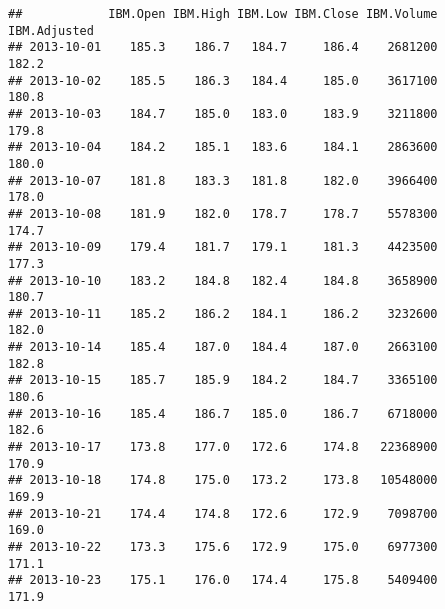 \begin{knitrout}
\color{fgcolor}\begin{kframe}
\begin{alltt}
\hlstd{(}\hlstd{,}  
\end{alltt}
\begin{verbatim}
##            IBM.Open IBM.High IBM.Low IBM.Close IBM.Volume IBM.Adjusted
## 2013-10-01    185.3    186.7   184.7     186.4    2681200        182.2
## 2013-10-02    185.5    186.3   184.4     185.0    3617100        180.8
## 2013-10-03    184.7    185.0   183.0     183.9    3211800        179.8
## 2013-10-04    184.2    185.1   183.6     184.1    2863600        180.0
## 2013-10-07    181.8    183.3   181.8     182.0    3966400        178.0
## 2013-10-08    181.9    182.0   178.7     178.7    5578300        174.7
## 2013-10-09    179.4    181.7   179.1     181.3    4423500        177.3
## 2013-10-10    183.2    184.8   182.4     184.8    3658900        180.7
## 2013-10-11    185.2    186.2   184.1     186.2    3232600        182.0
## 2013-10-14    185.4    187.0   184.4     187.0    2663100        182.8
## 2013-10-15    185.7    185.9   184.2     184.7    3365100        180.6
## 2013-10-16    185.4    186.7   185.0     186.7    6718000        182.6
## 2013-10-17    173.8    177.0   172.6     174.8   22368900        170.9
## 2013-10-18    174.8    175.0   173.2     173.8   10548000        169.9
## 2013-10-21    174.4    174.8   172.6     172.9    7098700        169.0
## 2013-10-22    173.3    175.6   172.9     175.0    6977300        171.1
## 2013-10-23    175.1    176.0   174.4     175.8    5409400        171.9
\end{verbatim}
\end{kframe}
\end{knitrout}
